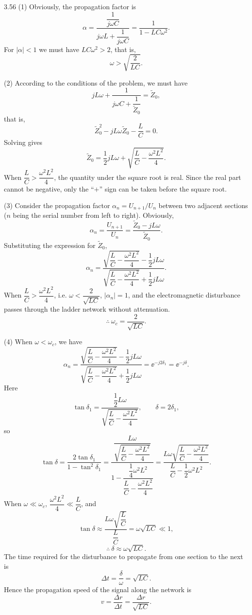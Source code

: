 \begin{solution}{3.56}
(1) Obviously, the propagation factor is
\[
\alpha=\frac{\dfrac{1}{j\omega C}}{j\omega L+\dfrac{1}{j\omega C}}
=\frac{1}{1-LC\omega^2}.
\]
For $|\alpha|<1$ we must have $LC\omega^2>2$, that is,
\[
\omega>\sqrt{\frac{2}{LC}}.
\]

(2) According to the conditions of the problem, we must have
\[
jL\omega+\frac{1}{j\omega C+\dfrac{1}{\tilde{Z}_0}}=\tilde{Z}_0,
\]
that is,
\[
\tilde{Z}_0^2-jL\omega\tilde{Z}_0-\frac{L}{C}=0.
\]
Solving gives
\[
\tilde{Z}_0=\frac{1}{2}jL\omega+\sqrt{\frac{L}{C}-\frac{\omega^2L^2}{4}}.
\]
When $\dfrac{L}{C}>\dfrac{\omega^2L^2}{4}$, the quantity under the square root is real. Since the real part cannot be negative, only the ``$+$'' sign can be taken before the square root.

(3) Consider the propagation factor $\alpha_n=U_{n+1}/U_n$ between two adjacent sections ($n$ being the serial number from left to right). Obviously,
\[
\alpha_n=\frac{U_{n+1}}{U_n}=\frac{\tilde{Z}_0-jL\omega}{\tilde{Z}_0}.
\]
Substituting the expression for $\tilde{Z}_0$,
\[
\alpha_n=\frac{\sqrt{\dfrac{L}{C}-\dfrac{\omega^2L^2}{4}}-\dfrac{1}{2}jL\omega}
{\sqrt{\dfrac{L}{C}-\dfrac{\omega^2L^2}{4}}+\dfrac{1}{2}jL\omega}.
\]
When $\dfrac{L}{C}>\dfrac{\omega^2L^2}{4}$, i.e. $\omega<\dfrac{2}{\sqrt{LC}}$, $|\alpha_n|=1$, and the electromagnetic disturbance passes through the ladder network without attenuation.
\[
\therefore\ \omega_c=\frac{2}{\sqrt{LC}}.
\]

(4) When $\omega<\omega_c$, we have
\[
\alpha_n=\frac{\sqrt{\dfrac{L}{C}-\dfrac{\omega^2L^2}{4}}-\dfrac{1}{2}jL\omega}
{\sqrt{\dfrac{L}{C}-\dfrac{\omega^2L^2}{4}}+\dfrac{1}{2}jL\omega}
=\ee^{-j2\delta_1}=\ee^{-j\delta}.
\]
Here
\[
\tan\delta_1=\frac{\dfrac{1}{2}L\omega}{\sqrt{\dfrac{L}{C}-\dfrac{\omega^2L^2}{4}}},\qquad \delta=2\delta_1,
\]
so
\[
\tan\delta=\frac{2\tan\delta_1}{1-\tan^2\delta_1}
=\frac{\dfrac{L\omega}{\sqrt{\dfrac{L}{C}-\dfrac{\omega^2L^2}{4}}}}
{1-\dfrac{\dfrac{1}{4}\omega^2L^2}{\dfrac{L}{C}-\dfrac{\omega^2L^2}{4}}}
=\frac{L\omega\sqrt{\dfrac{L}{C}-\dfrac{\omega^2L^2}{4}}}{\dfrac{L}{C}-\dfrac{1}{2}\omega^2L^2}.
\]
When $\omega\ll\omega_c$, $\dfrac{\omega^2L^2}{4}\ll\dfrac{L}{C}$, and
\[
\tan\delta\approx\frac{L\omega\sqrt{\dfrac{L}{C}}}{\dfrac{L}{C}}=\omega\sqrt{LC}\ll1,
\]
\[
\therefore\ \delta\approx\omega\sqrt{LC}.
\]
The time required for the disturbance to propagate from one section to the next is
\[
\Delta t=\frac{\delta}{\omega}=\sqrt{LC}.
\]
Hence the propagation speed of the signal along the network is
\[
v=\frac{\Delta r}{\Delta t}=\frac{\Delta r}{\sqrt{LC}}.
\]
\end{solution}


